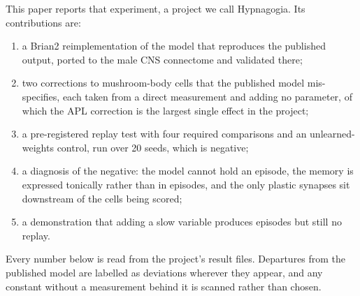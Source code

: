 \documentclass[11pt]{article}
\begin{document}
This paper reports that experiment, a project we call Hypnagogia. Its contributions are:
\begin{enumerate}\setlength\itemsep{1pt}
  \item a Brian2 reimplementation of the \citet{shiu2024} model that reproduces the published output, ported to the male CNS connectome and validated there;
  \item two corrections to mushroom-body cells that the published model mis-specifies, each taken from a direct measurement and adding no parameter, of which the APL correction is the largest single effect in the project;
  \item a pre-registered replay test with four required comparisons and an unlearned-weights control, run over 20 seeds, which is negative;
  \item a diagnosis of the negative: the model cannot hold an episode, the memory is expressed tonically rather than in episodes, and the only plastic synapses sit downstream of the cells being scored;
  \item a demonstration that adding a slow variable produces episodes but still no replay.
\end{enumerate}
Every number below is read from the project's result files. Departures from the published model are labelled as deviations wherever they appear, and any constant without a measurement behind it is scanned rather than chosen.
\end{document}
